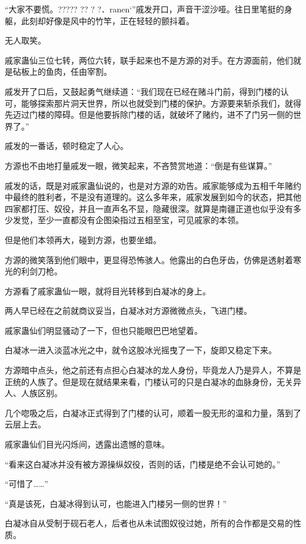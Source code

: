 
\begin{this_body}

“大家不要慌。????? ?? ? ?．ranen`”戚发开口，声音干涩沙哑。往日里笔挺的身躯，此刻却好像是风中的竹竿，正在轻轻的颤抖着。

无人取笑。

戚家蛊仙三位七转，两位六转，联手起来也不是方源的对手。在方源面前，他们就是砧板上的鱼肉，任由宰割。

戚发开了口后，又鼓起勇气继续道：“我们现在已经在赌斗门前，得到门楼的认可，能够探索那片洞天世界，所以也就受到门楼的保护。方源要来斩杀我们，就得先迈过门楼的障碍。但是他要拆除门楼的话，就破坏了赌约，进不了门另一侧的世界了。”

戚发的一番话，顿时稳定了人心。

方源也不由地打量戚发一眼，微笑起来，不吝赞赏地道：“倒是有些谋算。”

戚发的话，既是对戚家蛊仙说的，也是对方源的劝告。戚家能够成为五相千年赌约中最终的胜利者，不是没有道理的。这么多年来，戚家发展到如今的状态，把其他四家都打压、奴役，并且一直声名不显，隐藏很深。就算是南疆正道也似乎没有多少发觉，至少一直都没有企图染指过五相至宝，可见戚家的本领。

但是他们本领再大，碰到方源，也要坐蜡。

方源的微笑落到他们眼中，更显得恐怖骇人。他露出的白色牙齿，仿佛是透射着寒光的利剑刀枪。

方源看了戚家蛊仙一眼，就将目光转移到白凝冰的身上。

两人早已经在之前就商议妥当，白凝冰对方源微微点头，飞进门楼。

戚家蛊仙们明显骚动了一下，但也只能眼巴巴地望着。

白凝冰一进入淡蓝冰光之中，就令这股冰光摇曳了一下，旋即又稳定下来。

方源暗中点头，他之前还有点担心白凝冰的龙人身份，毕竟龙人乃是异人，不算是正统的人族了。但是现在就结果来看，门楼认可的只是白凝冰的血脉身份，无关异人、人族区别。

几个唿吸之后，白凝冰正式得到了门楼的认可，顺着一股无形的温和力量，落到了云层上去。

戚家蛊仙们目光闪烁间，透露出遗憾的意味。

“看来这白凝冰并没有被方源操纵奴役，否则的话，门楼是绝不会认可她的。”

“可惜了……”

“真是该死，白凝冰得到认可，也能进入门楼另一侧的世界！”

白凝冰自从受制于砚石老人，后者也从未试图奴役过她，所有的合作都是交易的性质。


\end{this_body}
